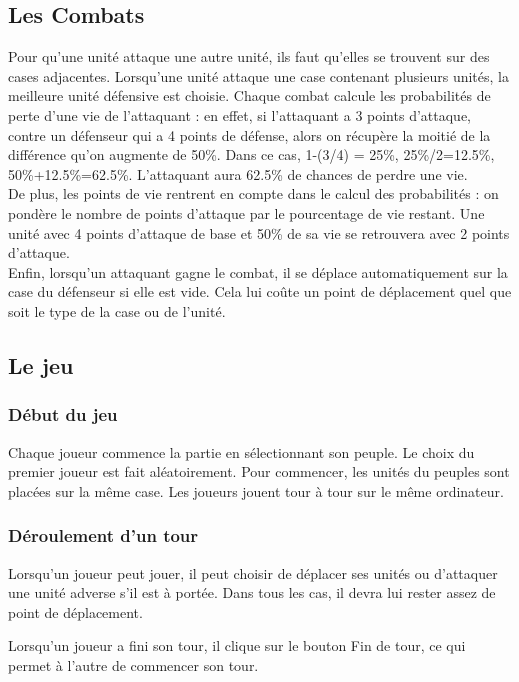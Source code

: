 \subsection{Les Combats}
Pour qu'une unité attaque une autre unité, ils faut qu'elles se trouvent sur des cases adjacentes. Lorsqu'une unité attaque une case contenant plusieurs unités, la meilleure unité défensive est choisie. Chaque combat calcule les probabilités de perte d'une vie de l'attaquant : en effet, si l'attaquant a 3 points d'attaque, contre un défenseur qui a 4 points de défense, alors on récupère la moitié de la différence qu'on augmente de 50\%. Dans ce cas, 1-(3/4) = 25\%, 25\%/2=12.5\%, 50\%+12.5\%=62.5\%. L'attaquant aura 62.5\% de chances de perdre une vie.\newline \\
De plus, les points de vie rentrent en compte dans le calcul des probabilités : on pondère le nombre de points d'attaque par le pourcentage de vie restant. Une unité avec 4 points d'attaque de base et 50\% de sa vie se retrouvera avec 2 points d'attaque.\newline \\
Enfin, lorsqu'un attaquant gagne le combat, il se déplace automatiquement sur la case du défenseur si elle est vide. Cela lui coûte un point de déplacement quel que soit le type de la case ou de l'unité.

\subsection{Le jeu}
\subsubsection{Début du jeu}
Chaque joueur commence la partie en sélectionnant son peuple. Le choix du premier joueur est fait aléatoirement. Pour commencer, les unités du peuples sont placées sur la même case. Les joueurs jouent tour à tour sur le même ordinateur.
\subsubsection{Déroulement d'un tour}
Lorsqu'un joueur peut jouer, il peut choisir de déplacer ses unités ou d'attaquer une unité adverse s'il est à portée. Dans tous les cas, il devra lui rester assez de point de déplacement.

Lorsqu'un joueur a fini son tour, il clique sur le bouton Fin de tour, ce qui permet à l'autre de commencer son tour.
